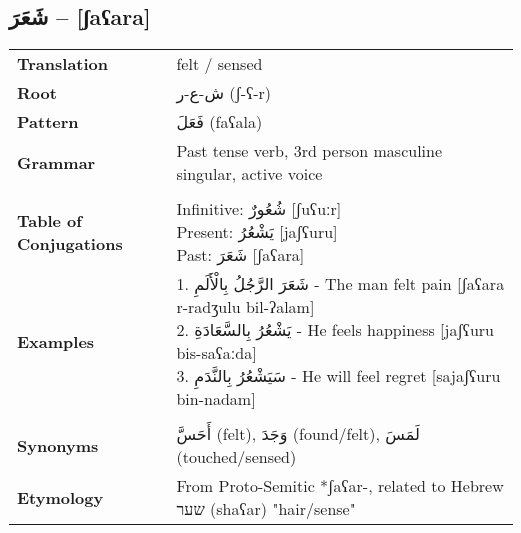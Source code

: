 \documentclass[letter,12pt]{article}
\begin{document}
\subsection{\textarabic{شَعَرَ} – [ʃaʕara]}
\begin{tabular}{p{3cm}p{10cm}}
\toprule
\textbf{Translation} & felt / sensed \\
\textbf{Root} & \textarabic{ش-ع-ر} (ʃ-ʕ-r) \\
\textbf{Pattern} & \textarabic{فَعَلَ} (faʕala) \\
\textbf{Grammar} & Past tense verb, 3rd person masculine singular, active voice \\
\midrule \\
\textbf{Table of Conjugations} & \makecell[l]{
Infinitive: \textarabic{شُعُورٌ} [ʃuʕuːr] \\
Present: \textarabic{يَشْعُرُ} [jaʃʕuru] \\
Past: \textarabic{شَعَرَ} [ʃaʕara]
} \\
\midrule
\textbf{Examples} & \makecell[l]{\parbox{9.5cm}{
1. \textarabic{شَعَرَ الرَّجُلُ بِالْأَلَمِ} - The man felt pain [ʃaʕara r-radʒulu bil-ʔalam]\\
2. \textarabic{يَشْعُرُ بِالسَّعَادَةِ} - He feels happiness [jaʃʕuru bis-saʕaːda]\\
3. \textarabic{سَيَشْعُرُ بِالنَّدَمِ} - He will feel regret [sajaʃʕuru bin-nadam]
}} \\
\midrule \\
\textbf{Synonyms} & \textarabic{أَحَسَّ} (felt), \textarabic{وَجَدَ} (found/felt), \textarabic{لَمَسَ} (touched/sensed) \\
\textbf{Etymology} & From Proto-Semitic *ʃaʕar-, related to Hebrew \texthebrew{שער} (shaʕar) "hair/sense" \\
\bottomrule
\end{tabular}
\end{document}
